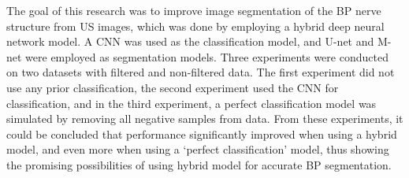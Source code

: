 The goal of this research was to improve image segmentation of the BP nerve structure from US images, which was done by employing a hybrid deep neural network model. A CNN was used as the classification model, and U-net and M-net were employed as segmentation models. Three experiments were conducted on two datasets with filtered and non-filtered data. The first experiment did not use any prior classification, the second experiment used the CNN for classification, and in the third experiment, a perfect classification model was simulated by removing all negative samples from data. From these experiments, it could be concluded that performance significantly improved when using a hybrid model, and even more when using a `perfect classification' model, thus showing the promising possibilities of using hybrid model for accurate BP segmentation.